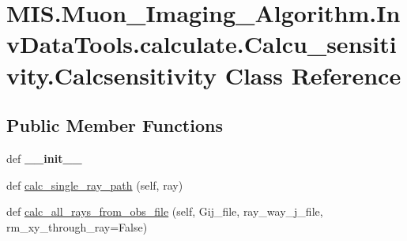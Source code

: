 \hypertarget{classMIS_1_1Muon__Imaging__Algorithm_1_1InvDataTools_1_1calculate_1_1Calcu__sensitivity_1_1Calcsensitivity}{}\section{M\+I\+S.\+Muon\+\_\+\+Imaging\+\_\+\+Algorithm.\+Inv\+Data\+Tools.\+calculate.\+Calcu\+\_\+sensitivity.\+Calcsensitivity Class Reference}
\label{classMIS_1_1Muon__Imaging__Algorithm_1_1InvDataTools_1_1calculate_1_1Calcu__sensitivity_1_1Calcsensitivity}
\subsection*{Public Member Functions}
\begin{DoxyCompactItemize}
\item 
\mbox{\label{classMIS_1_1Muon__Imaging__Algorithm_1_1InvDataTools_1_1calculate_1_1Calcu__sensitivity_1_1Calcsensitivity_ae81897a8c001efd80fbb14c07fe140af}} 
def {\bfseries \+\_\+\+\_\+init\+\_\+\+\_\+}
\item 
def \hyperlink{classMIS_1_1Muon__Imaging__Algorithm_1_1InvDataTools_1_1calculate_1_1Calcu__sensitivity_1_1Calcsensitivity_ac24d10720bebf7df0ae66fdadefb4e3c}{calc\+\_\+single\+\_\+ray\+\_\+path} (self, ray)
\item 
def \hyperlink{classMIS_1_1Muon__Imaging__Algorithm_1_1InvDataTools_1_1calculate_1_1Calcu__sensitivity_1_1Calcsensitivity_a29017d735ded4c0d9a613b26bd3769c8}{calc\+\_\+all\+\_\+rays\+\_\+from\+\_\+obs\+\_\+file} (self, Gij\+\_\+file, ray\+\_\+way\+\_\+j\+\_\+file, rm\+\_\+xy\+\_\+through\+\_\+ray=False)
\end{DoxyCompactItemize}
